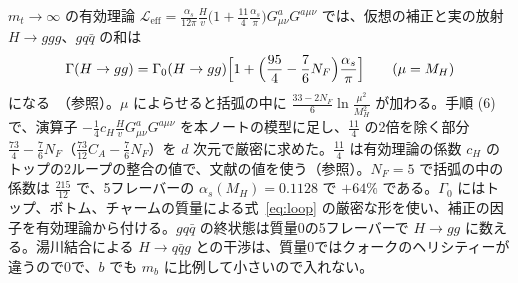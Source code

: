 \documentclass[a4paper,10pt]{ltjsarticle}
\begin{document}
$m_t\to\infty$ の有効理論 $\mathcal L_{\mathrm{eff}}=\frac{\alpha_s}{12\pi}\frac Hv\bigl(1+\frac{11}4\frac{\alpha_s}\pi\bigr)G^a_{\mu\nu}G^{a\mu\nu}$ では、仮想の補正と実の放射 $H\to ggg$、$gq\bar q$ の和は
\begin{equation}
\Gamma(H\to gg)=\Gamma_0(H\to gg)\Bigl[1+\Bigl(\frac{95}4-\frac76N_F\Bigr)\frac{\alpha_s}\pi\Bigr]\qquad(\mu=M_H)
\label{eq:hgg}
\end{equation}
になる~\cite{spira95}（参照）。$\mu$ によらせると括弧の中に $\frac{33-2N_F}6\ln\frac{\mu^2}{M_H^2}$ が加わる。手順 (6) で、演算子 $-\frac14c_H\frac Hv G^a_{\mu\nu}G^{a\mu\nu}$ を本ノートの模型に足し、$\frac{11}4$ の2倍を除く部分 $\frac{73}4-\frac76N_F$（$\frac{73}{12}C_A-\frac76N_F$）を $d$ 次元で厳密に求めた。$\frac{11}4$ は有効理論の係数 $c_H$ のトップの2ループの整合の値で、文献の値を使う（参照）。$N_F=5$ で括弧の中の係数は $\frac{215}{12}$ で、5フレーバーの $\alpha_s(M_H)=0.1128$ で $+64\%$ である。$\Gamma_0$ にはトップ、ボトム、チャームの質量による式~\eqref{eq:loop} の厳密な形を使い、補正の因子を有効理論から付ける。$gq\bar q$ の終状態は質量0の5フレーバーで $H\to gg$ に数える。湯川結合による $H\to q\bar qg$ との干渉は、質量0ではクォークのヘリシティーが違うので0で、$b$ でも $m_b$ に比例して小さいので入れない。
\end{document}
